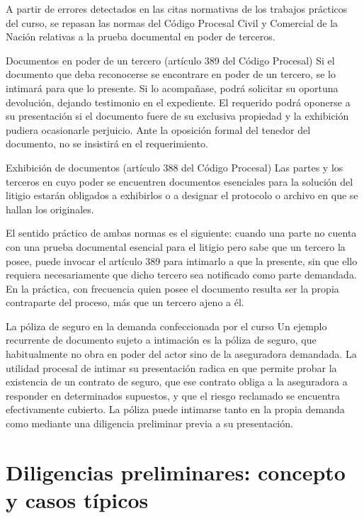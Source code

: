 \documentclass[12pt,oneside]{book}
\begin{document}
A partir de errores detectados en las citas normativas de los trabajos prácticos del curso, se repasan las normas del Código Procesal Civil y Comercial de la Nación relativas a la prueba documental en poder de terceros.

\begin{definition}{Documentos en poder de un tercero (artículo 389 del Código Procesal)}
Si el documento que deba reconocerse se encontrare en poder de un tercero, se lo intimará para que lo presente. Si lo acompañase, podrá solicitar su oportuna devolución, dejando testimonio en el expediente. El requerido podrá oponerse a su presentación si el documento fuere de su exclusiva propiedad y la exhibición pudiera ocasionarle perjuicio. Ante la oposición formal del tenedor del documento, no se insistirá en el requerimiento.
\end{definition}

\begin{definition}{Exhibición de documentos (artículo 388 del Código Procesal)}
Las partes y los terceros en cuyo poder se encuentren documentos esenciales para la solución del litigio estarán obligados a exhibirlos o a designar el protocolo o archivo en que se hallan los originales.
\end{definition}

El sentido práctico de ambas normas es el siguiente: cuando una parte no cuenta con una prueba documental esencial para el litigio pero sabe que un tercero la posee, puede invocar el artículo 389 para intimarlo a que la presente, sin que ello requiera necesariamente que dicho tercero sea notificado como parte demandada. En la práctica, con frecuencia quien posee el documento resulta ser la propia contraparte del proceso, más que un tercero ajeno a él.

\begin{example}{La póliza de seguro en la demanda confeccionada por el curso}
Un ejemplo recurrente de documento sujeto a intimación es la póliza de seguro, que habitualmente no obra en poder del actor sino de la aseguradora demandada. La utilidad procesal de intimar su presentación radica en que permite probar la existencia de un contrato de seguro, que ese contrato obliga a la aseguradora a responder en determinados supuestos, y que el riesgo reclamado se encuentra efectivamente cubierto. La póliza puede intimarse tanto en la propia demanda como mediante una diligencia preliminar previa a su presentación.
\end{example}

\section{Diligencias preliminares: concepto y casos típicos}
\end{document}
